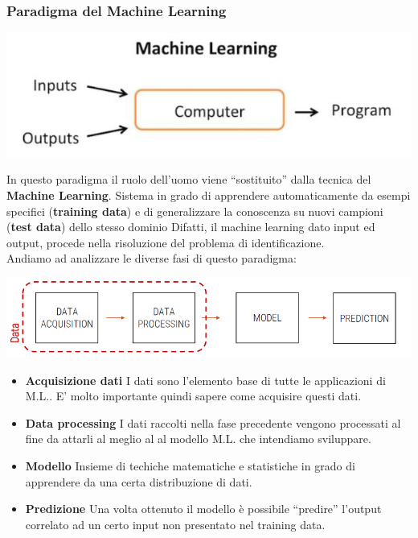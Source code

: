 \subsubsection{Paradigma del Machine Learning}
\begin{center}
    \includegraphics[scale=0.7]{images/Paradigma_del_ML.png}
\end{center}
In questo paradigma il ruolo dell'uomo viene ``sostituito'' dalla
%
tecnica del \textbf{Machine Learning}.
{
    Sistema in grado di apprendere automaticamente da esempi 
%
    specifici (\textbf{training data}) e di generalizzare la 
%
    conoscenza su nuovi campioni (\textbf{test data}) dello stesso
%
    dominio
}
Difatti, il machine learning dato input ed output, procede nella
%
risoluzione del problema di identificazione.
\\
Andiamo ad analizzare le diverse fasi di questo paradigma:
\\  
\begin{center}
    \includegraphics[scale=0.7]{images/Paradigma_ML_fasi.png}
\end{center}
\begin{itemize}
    \item \textbf{Acquisizione dati} I dati sono l'elemento base
%
    di tutte le applicazioni di M.L.. E' molto importante quindi
    sapere come acquisire questi dati.
    \item \textbf{Data processing} I dati raccolti nella fase 
%
    precedente vengono processati al fine da attarli al meglio al 
%
    al modello M.L. che intendiamo sviluppare.
    \item \textbf{Modello} Insieme di techiche matematiche e 
%
    statistiche in grado di apprendere da una certa distribuzione di 
%
    dati.
    \item\textbf{Predizione} Una volta ottenuto il modello è 
% 
    possibile ``predire'' l'output correlato ad un certo input non 
%
    presentato nel training data.
\end{itemize}
\newpage
